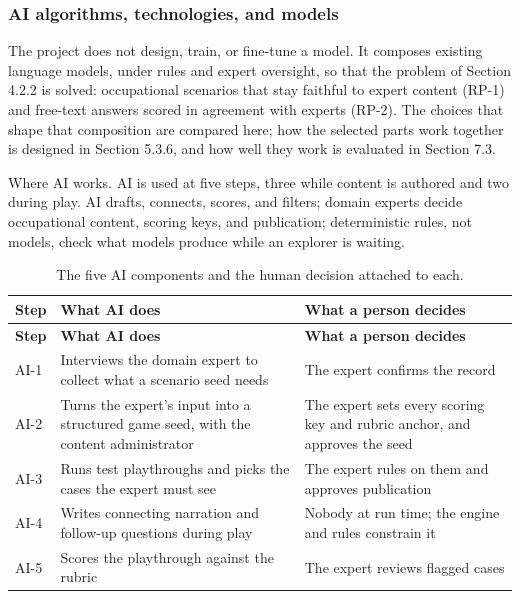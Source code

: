 \subsubsection{AI algorithms, technologies, and models}

The project does not design, train, or fine-tune a model. It composes existing language models, under rules and expert oversight, so that the problem of Section 4.2.2 is solved: occupational scenarios that stay faithful to expert content (RP-1) and free-text answers scored in agreement with experts (RP-2). The choices that shape that composition are compared here; how the selected parts work together is designed in Section 5.3.6, and how well they work is evaluated in Section 7.3.

Where AI works. AI is used at five steps, three while content is authored and two during play. AI drafts, connects, scores, and filters; domain experts decide occupational content, scoring keys, and publication; deterministic rules, not models, check what models produce while an explorer is waiting.

{\small
\begin{longtable}{|>{\raggedright\arraybackslash}p{}|>{\raggedright\arraybackslash}p{}|>{\raggedright\arraybackslash}p{}|}
\caption{The five AI components and the human decision attached to each.} \\
\hline
\textbf{Step} & \textbf{What AI does} & \textbf{What a person decides} \\ \hline
\endfirsthead
\hline
\textbf{Step} & \textbf{What AI does} & \textbf{What a person decides} \\ \hline
\endhead
AI-1 & Interviews the domain expert to collect what a scenario seed needs & The expert confirms the record \\ \hline
AI-2 & Turns the expert's input into a structured game seed, with the content administrator & The expert sets every scoring key and rubric anchor, and approves the seed \\ \hline
AI-3 & Runs test playthroughs and picks the cases the expert must see & The expert rules on them and approves publication \\ \hline
AI-4 & Writes connecting narration and follow-up questions during play & Nobody at run time; the engine and rules constrain it \\ \hline
AI-5 & Scores the playthrough against the rubric & The expert reviews flagged cases \\ \hline
\end{longtable}
}

